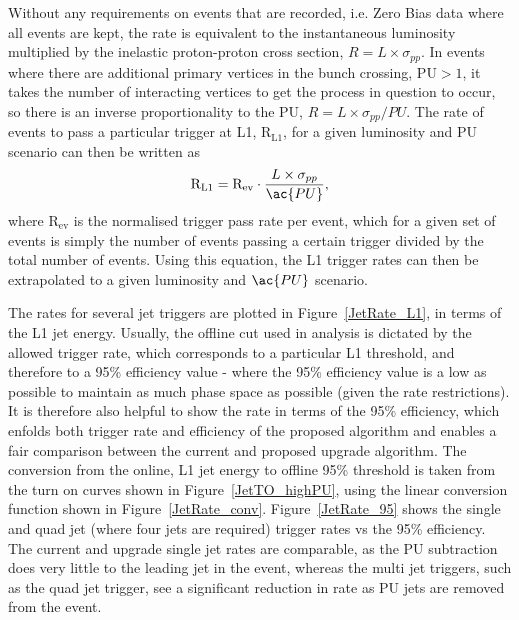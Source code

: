 Without any requirements on events that are recorded, i.e. Zero Bias data where all events are kept, the rate is 
equivalent to the instantaneous luminosity multiplied by the inelastic proton-proton cross section, $R = L\times \sigma_{pp}$. 
In events where there are additional primary vertices in the bunch crossing, \ac{PU}$>1$, it takes the number of interacting vertices to get the process in question to occur, so there is an inverse proportionality to the \ac{PU}, $R = L\times \sigma_{pp}/PU$.
The rate of events to pass a particular trigger at \ac{L1}, $\text{R}_{\text{L1}}$, for a given luminosity and \ac{PU} scenario can then be written as
%
\begin{equation}
\text{R}_{\rm L1} = \text{R}_{\text{ev}} \cdot \frac{L\times \sigma_{pp}}{\ac{PU}},
\end{equation}
%
where $\text{R}_{\text{ev}}$ is the normalised trigger pass rate per event, which for a given set of events is simply the number of events passing a certain trigger divided by the total number of events.
%
Using this equation, the \ac{L1} trigger rates can then be extrapolated to a given luminosity and $\ac{PU}$ scenario.


The rates for several jet triggers are plotted in Figure~\ref{JetRate_L1}, in terms of the \ac{L1} jet energy.
%
Usually, the offline cut used in analysis is dictated by the allowed trigger rate, which corresponds to a particular \ac{L1} threshold, and therefore to a 95\% efficiency value - where the 95\% efficiency value is a low as possible to maintain as much phase space as possible (given the rate restrictions).
It is therefore also helpful to show the rate in terms of the 95\% efficiency, which enfolds both trigger rate and efficiency of the proposed algorithm and enables a fair comparison between the current and proposed upgrade algorithm.
The conversion from the online, \ac{L1} jet energy to offline 95\% threshold is taken from the turn on curves shown in Figure~\ref{JetTO_highPU}, using the linear conversion function shown in Figure~\ref{JetRate_conv}.
Figure~\ref{JetRate_95} shows the single and quad jet (where four jets are required) trigger rates vs the 95\% efficiency. 
The current and upgrade single jet rates are comparable, as the PU subtraction does very little to the leading jet in the event, whereas the multi jet triggers, such as the quad jet trigger, see a significant reduction in rate as PU jets are removed from the event.     

